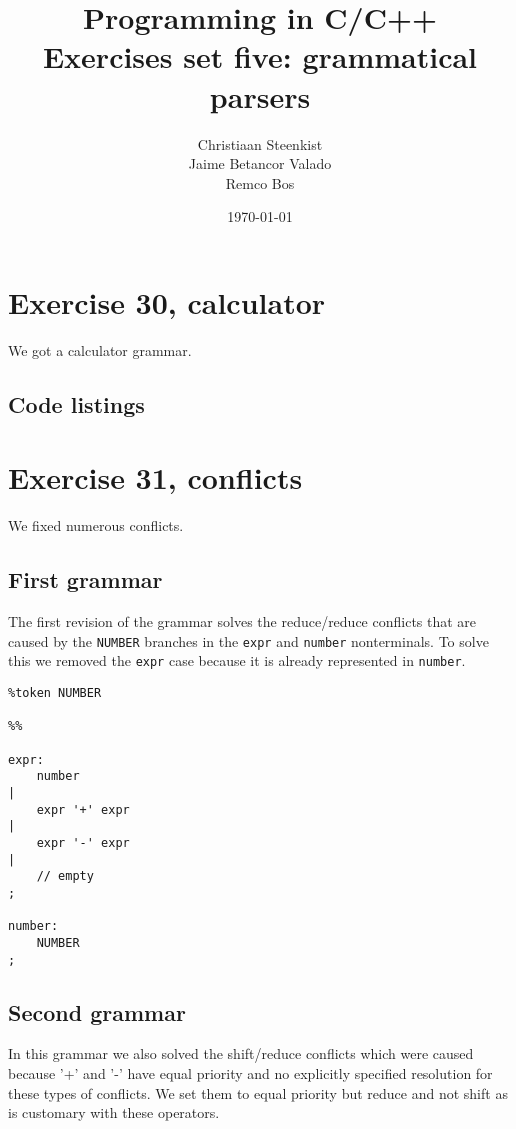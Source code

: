 \documentclass[11pt]{article}
\begin{document}
\title{Programming in C/C++ \\
       Exercises set five: grammatical parsers
}
\date{\today}
\author{Christiaan Steenkist \\
Jaime Betancor Valado \\
Remco Bos \\
}

\maketitle
\section*{Exercise 30, calculator}
We got a calculator grammar.

\subsection*{Code listings}


\section*{Exercise 31, conflicts}
We fixed numerous conflicts.

\subsection*{First grammar}
The first revision of the grammar solves the reduce/reduce conflicts that are caused by the \texttt{NUMBER} branches in the \texttt{expr} and \texttt{number} nonterminals. To solve this we removed the \texttt{expr} case because it is already represented in \texttt{number}.

\begin{lstlisting}
%token NUMBER

%%

expr:
    number
|
    expr '+' expr
|
    expr '-' expr
|
	// empty
;

number:
    NUMBER
;
\end{lstlisting}

\subsection*{Second grammar}
In this grammar we also solved the shift/reduce conflicts which were caused because '+' and '-' have equal priority and no explicitly specified resolution for these types of conflicts. We set them to equal priority but reduce and not shift as is customary with these operators.
\end{document}
